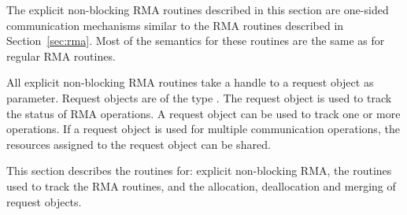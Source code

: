The explicit non-blocking \ac{RMA} routines described in this section are
one-sided communication mechanisms similar to the \ac{RMA} routines
described in Section~\ref{sec:rma}. Most of the semantics for these
routines are the same as for regular \ac{RMA} routines.

All explicit non-blocking \ac{RMA} routines take a handle to a request
object as parameter. Request objects are of the type
. The request object is used to track the
status of \ac{RMA} operations. A request object can be used to track one
or more operations. If a request object is used for multiple
communication operations, the resources assigned to the request object
can be shared.

This section describes the routines for: explicit non-blocking \ac{RMA},
the routines used to track the \ac{RMA} routines, and the
allocation, deallocation and merging of request objects.
